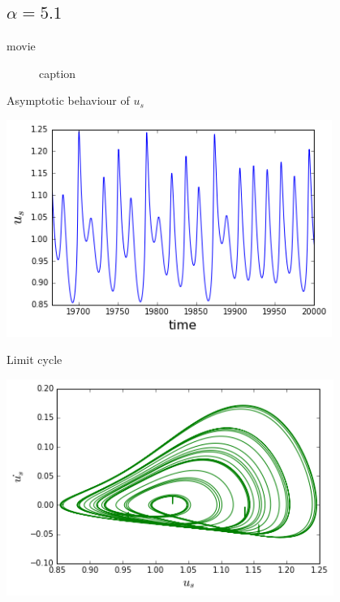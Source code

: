 \documentclass{beamer}
\begin{document}
\subsection{$\alpha = 5.1$}
\begin{frame}{movie}
	\begin{figure}[h!]
		\centering    
		\caption{caption}
	\end{figure} 
\end{frame}
\begin{frame}{Asymptotic behaviour of $u_s$}
	\begin{center}
		\includegraphics[height=200pt]{51}\\
		
	\end{center}	
\end{frame}
\begin{frame}{Limit cycle}
	\begin{center}
		\includegraphics[height=200pt]{lim51}\\
		
	\end{center}	
\end{frame}
\end{document}
